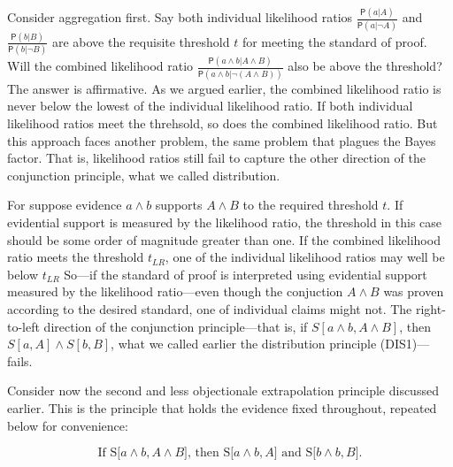 \documentclass[10pt,dvipsnames,enabledeprecatedfontcommands]{scrartcl}
\newcommand{\et}{\wedge}
\newcommand{\pr}[1]{\mathsf{P}(#1)}
\begin{document}
Consider aggregation first. Say both individual likelihood ratios
\(\frac{\pr{a |A}}{\pr{a | \neg A}}\) and
\(\frac{\pr{b |B}}{\pr{b | \neg B}}\) are above the requisite threshold
\(t\) for meeting the standard of proof. Will the combined likelihood
ratio \(\frac{\pr{ a \et b |A \et B}}{\pr{a \et b | \neg (A \et B)}}\)
also be above the threshold? The answer is affirmative. As we argued
earlier, the combined likelihood ratio is never below the lowest of the
individual likelihood ratio. If both individual likelihood ratios meet
the threhsold, so does the combined likelihood ratio. But this approach
faces another problem, the same problem that plagues the Bayes factor.
That is, likelihood ratios still fail to capture the other direction of
the conjunction principle, what we called distribution.

For suppose evidence \(a \et b\) supports \(A \et B\) to the required
threshold \(t\). If evidential support is measured by the likelihood
ratio, the threshold in this case should be some order of magnitude
greater than one. If the combined likelihood ratio meets the threshold
\(t_{LR}\), one of the individual likelihood ratios may well be below
\(t_{LR}\) So---if the standard of proof is interpreted using evidential
support measured by the likelihood ratio---even though the conjuction
\(A \et B\) was proven according to the desired standard, one of
individual claims might not. The right-to-left direction of the
conjunction principle---that is, if \(S[a \et b, A \et B]\), then
\(S[a, A] \et S[b, B]\), what we called earlier the distribution
principle (DIS1)---fails.

Consider now the second and less objectionale extrapolation principle
discussed earlier. This is the principle that holds the evidence fixed
throughout, repeated below for convenience:

\[\text{If S[$a \wedge b, A\wedge B$], then S[$a \wedge b, A$] and S[$b \wedge b, B$].} \tag{DIS2}\]
\end{document}
